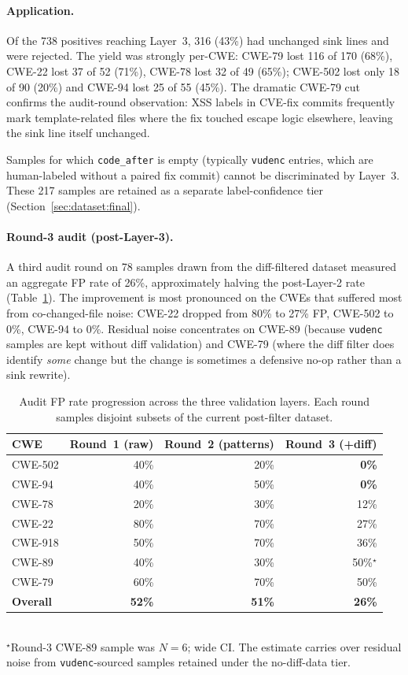 \paragraph{Application.}
Of the 738 positives reaching Layer~3, 316 (43\%) had unchanged
sink lines and were rejected. The yield was strongly per-CWE:
CWE-79 lost 116 of 170 (68\%), CWE-22 lost 37 of 52 (71\%), CWE-78
lost 32 of 49 (65\%); CWE-502 lost only 18 of 90 (20\%) and
CWE-94 lost 25 of 55 (45\%). The dramatic CWE-79 cut confirms
the audit-round observation: XSS labels in CVE-fix commits
frequently mark template-related files where the fix touched
escape logic elsewhere, leaving the sink line itself unchanged.

Samples for which \texttt{code\_after} is empty (typically
\texttt{vudenc} entries, which are human-labeled without a paired
fix commit) cannot be discriminated by Layer~3. These 217 samples
are retained as a separate label-confidence tier
(Section~\ref{sec:dataset:final}).

\paragraph{Round-3 audit (post-Layer-3).}
A third audit round on 78 samples drawn from the diff-filtered
dataset measured an aggregate FP rate of 26\%, approximately halving
the post-Layer-2 rate (Table~\ref{tab:audit-progression}).
The improvement is most pronounced on the CWEs that suffered most
from co-changed-file noise: CWE-22 dropped from 80\% to 27\% FP,
CWE-502 to 0\%, CWE-94 to 0\%. Residual noise concentrates on
CWE-89 (because \texttt{vudenc} samples are kept without diff
validation) and CWE-79 (where the diff filter does identify
\emph{some} change but the change is sometimes a defensive
no-op rather than a sink rewrite).

\begin{table}[h]
\centering
\caption{Audit FP rate progression across the three validation
layers. Each round samples disjoint subsets of the current
post-filter dataset.}
\label{tab:audit-progression}
\begin{tabular}{lrrr}
\toprule
\textbf{CWE} & \textbf{Round~1 (raw)} & \textbf{Round~2 (patterns)} & \textbf{Round~3 (+diff)} \\
\midrule
CWE-502 & 40\% & 20\% & \textbf{0\%} \\
CWE-94  & 40\% & 50\% & \textbf{0\%} \\
CWE-78  & 20\% & 30\% & 12\% \\
CWE-22  & 80\% & 70\% & 27\% \\
CWE-918 & 50\% & 70\% & 36\% \\
CWE-89  & 40\% & 30\% & 50\%$^\star$ \\
CWE-79  & 60\% & 70\% & 50\% \\
\midrule
\textbf{Overall} & \textbf{52\%} & \textbf{51\%} & \textbf{26\%} \\
\bottomrule
\end{tabular}
\\[1ex]
{\footnotesize $^\star$Round-3 CWE-89 sample was $N=6$; wide CI.
The estimate carries over residual noise from
\texttt{vudenc}-sourced samples retained under the no-diff-data tier.}
\end{table}

